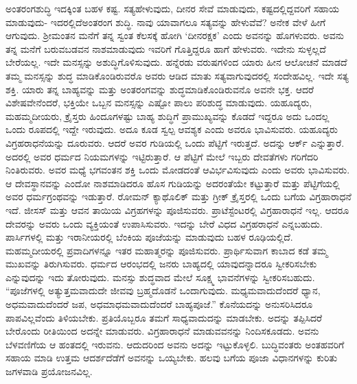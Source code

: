 ಅಂತರಂಗಶುದ್ಧಿ ಇದಕ್ಕಿಂತ ಬಹಳ ಕಷ್ಟ. ಸತ್ಯಹೇಳುವುದು, ದೀನರ ಸೇವೆ ಮಾಡುವುದು, ಕಷ್ಟದಲ್ಲಿದ್ದವರಿಗೆ ಸಹಾಯ ಮಾಡುವುದು- ಇದರಲ್ಲಿದೆ\break ಅಂತರಂಗ ಶುದ್ಧಿ. ನಾವು ಯಾವಾಗಲೂ ಸತ್ಯವನ್ನು ಹೇಳುವೆವೆ? ಅನೇಕ ವೇಳೆ ಹೀಗೆ ಆಗುವುದು. ಶ‍್ರೀಮಂತನ ಮನೆಗೆ ತನ್ನ ಸ್ವಂತ ಕೆಲಸಕ್ಕೆ ಹೋಗಿ ‘ದೀನರಕ್ಷಕ’ ಎಂದು ಅವನನ್ನು ಹೊಗಳುವರು. ಅವನು ತನ್ನ ಮನೆಗೆ ಬರುವ\break ಬಡವನ ನಾಶಮಾಡುವುದು ಇವರಿಗೆ ಗೊತ್ತಿದ್ದರೂ ಹಾಗೆ ಹೇಳುವರು. ಇದೇನು ಸುಳ್ಳಲ್ಲದೆ ಬೇರೆಯಲ್ಲ. ಇದೇ ಮನಸ್ಸನ್ನು ಅಶುದ್ಧಿಗೊಳಿಸುವುದು. ಹನ್ನೆರಡು ವರುಷಗಳಿಂದ ಯಾರು ಹೀನ ಆಲೋಚನೆ ಮಾಡದೆ ತಮ್ಮ ಮನಸ್ಸನ್ನು ಶುದ್ಧ ಮಾಡಿಕೊಂಡಿರುವರೊ ಅವರು ಆಡಿದ ಮಾತು ಸತ್ಯವಾಗುವುದರಲ್ಲಿ ಸಂದೇಹವಿಲ್ಲ. ಇದೇ ಸತ್ಯ ಶಕ್ತಿ. ಯಾರು ತನ್ನ ಬಾಹ್ಯವನ್ನು ಮತ್ತು ಅಂತರಂಗವನ್ನು ಶುದ್ಧಮಾಡಿಕೊಂಡಿರುವನೊ ಅವನೇ ಭಕ್ತ. ಆದರೆ ವಿಶೇಷವೇನೆಂದರೆ, ಭಕ್ತಿಯೇ ಒಬ್ಬನ ಮನಸ್ಸನ್ನು ಎಷ್ಟೋ ಪಾಲು ಪರಿಶುದ್ಧ ಮಾಡುವುದು. ಯಹೂದ್ಯರು, ಮಹಮ್ಮದೀಯರು, ಕ್ರೈಸ್ತರು ಹಿಂದೂಗಳಷ್ಟು ಬಾಹ್ಯ ಶುದ್ಧಿಗೆ ಪ್ರಾಮುಖ್ಯವನ್ನು ಕೊಡದೆ ಇದ್ದರೂ ಅದು ಒಂದಲ್ಲ ಒಂದು ರೂಪದಲ್ಲಿ ಇದ್ದೇ ಇರುವುದು. ಅದೂ ಕೂಡ ಸ್ವಲ್ಪ ಆವಶ್ಯಕ ಎಂದು ಅವರೂ ಭಾವಿಸುವರು. ಯಹೂದ್ಯರು ವಿಗ್ರಹರಾಧನೆಯನ್ನು ದೂರುವರು. ಆದರೆ ಅವರ ಗುಡಿಯಲ್ಲಿ ಒಂದು ಪೆಟ್ಟಿಗೆ ಇರುತ್ತದೆ. ಅದನ್ನು ಆರ್ಕ್​ ಎನ್ನುತ್ತಾರೆ. ಅದರಲ್ಲಿ ಅವರ ಧರ್ಮದ ನಿಯಮಗಳನ್ನು ಇಟ್ಟಿರುತ್ತಾರೆ. ಆ ಪೆಟ್ಟಿಗೆ ಮೇಲೆ ಇಬ್ಬರು ದೇವತೆಗಳು ಗರಿಗೆದರಿ ನಿಂತಿರುವರು. ಅವರ ಮಧ್ಯೆ ಭಗವಂತನ ಶಕ್ತಿ ಒಂದು ಮೋಡದಂತೆ ಆವಿರ್ಭವಿಸುವುದು ಎಂದು ಅವರು ಭಾವಿಸುವರು. ಆ ದೇವಸ್ಥಾನವನ್ನು ಎಂದೋ ನಾಶಮಾಡಿದರೂ ಹೊಸ ಗುಡಿಯನ್ನು ಅದರಂತೆಯೇ ಕಟ್ಟುತ್ತಾರೆ ಮತ್ತು ಪೆಟ್ಟಿಗೆಯಲ್ಲಿ ಅವರ ಧರ್ಮಗ್ರಂಥವನ್ನು ಇಡುತ್ತಾರೆ. ರೋಮನ್​ ಕ್ಯಾಥೊಲಿಕ್​ ಮತ್ತು ಗ್ರೀಕ್​ ಕ್ರೈಸ್ತರಲ್ಲಿ ಒಂದು ಬಗೆಯ ವಿಗ್ರಹಾರಾಧನೆ ಇದೆ. ಜೀಸಸ್​ ಮತ್ತು ಆವನ ತಾಯಿಯ ವಿಗ್ರಹಗಳನ್ನು ಪೂಜಿಸುವರು. ಪ್ರಾಟೆಸ್ಟೆಂಟರಲ್ಲಿ ವಿಗ್ರಹಾರಾಧನೆ ಇಲ್ಲ. ಆದರೂ ದೇವರನ್ನು ಅವರು ಒಂದು ವ್ಯಕ್ತಿಯಂತೆ ಉಪಾಸಿಸುವರು. ಇದನ್ನು ಬೇರೆ ವಿಧದ ವಿಗ್ರಹರಾಧನೆ ಎನ್ನಬಹುದು. ಪಾರ್ಸಿಗಳಲ್ಲಿ ಮತ್ತು ಇರಾನೀಯರಲ್ಲಿ ಬೆಂಕಿಯ ಪೂಜೆಯನ್ನು ಮಾಡುವುದು ಬಹಳ ರೂಢಿಯಲ್ಲಿದೆ. ಮಹಮ್ಮದೀಯರಲ್ಲಿ ಪ್ರವಾದಿಗಳನ್ನೂ ಇತರ ಮಹಾತ್ಮರನ್ನು ಪೂಜಿಸುವರು. ಪ್ರಾರ್ಥಿಸುವಾಗ ಕಾಬಾದ ಕಡೆ ತಮ್ಮ ಮುಖವನ್ನು ತಿರುಗಿಸುವರು. ಧರ್ಮದ ಆರಂಭದಲ್ಲಿ ಜನರು ಬಾಹ್ಯದಲ್ಲಿ ಯಾವುದನ್ನಾದರೂ ಸ್ವೀಕರಿಸಬೇಕು ಎನ್ನುವುದನ್ನು ಇದು ತೋರುವುದು. ಮನಸ್ಸು ಶುದ್ಧವಾದ ಮೇಲೆ ಸೂಕ್ಷ್ಮ ಭಾವನೆಗಳನ್ನು ಸ್ವೀಕರಿಸಬಹುದು. “ಪೂಜೆಗಳಲ್ಲಿ ಅತ್ಯುತ್ತಮವಾದುದೇ ಜೀವವು ಬ್ರಹ್ಮದೊಡನೆ ಒಂದಾಗುವುದು. ಮಧ್ಯಮವಾದುದೆಂದರೆ ಧ್ಯಾನ, ಅಧಮವಾದುದೆಂದರೆ ಜಪ, ಅಧಮಾಧಮವಾದುದೆಂದರೆ ಬಾಹ್ಯಪೂಜೆ.” ಕೊನೆಯದನ್ನು ಅನುಸರಿಸಿದರೂ ಪಾಪವಿಲ್ಲವೆಂದು ತಿಳಿಯಬೇಕು. ಪ್ರತಿಯೊಬ್ಬರೂ ತಮಗೆ ಸಾಧ್ಯವಾದುದನ್ನು ಮಾಡಬೇಕು. ಅದನ್ನು ತಪ್ಪಿಸಿದರೆ ಬೇರೊಂದು ರೀತಿಯಿಂದ ಅದನ್ನೇ ಮಾಡುವರು. ವಿಗ್ರಹಾರಾಧನೆ ಮಾಡುವವನನ್ನು ನಿಂದಿಸಕೂಡದು. ಅವನು ಬೆಳವಣಿಗೆಯ ಆ ಹಂತದಲ್ಲಿ ಇರುವನು. ಆದುದರಿಂದ ಅವನು ಅದನ್ನು ಇಟ್ಟುಕೊಳ್ಳಲಿ. ಬುದ್ಧಿವಂತರು ಅಂತಹವರಿಗೆ ಸಹಾಯ ಮಾಡಿ ಉತ್ತಮ ಆದರ್ಶದೆಡೆಗೆ ಅವನನ್ನು ಒಯ್ಯಬೇಕು. ಹಲವು ಬಗೆಯ ಪೂಜಾ ವಿಧಾನಗಳನ್ನು ಕುರಿತು ಜಗಳವಾಡಿ ಪ್ರಯೋಜನವಿಲ್ಲ.

